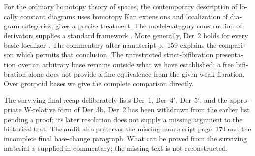 \begin{otherlanguage}{english}
For the ordinary homotopy theory of spaces, the contemporary description of locally constant diagrams uses homotopy Kan extensions and localization of diagram categories; \citet{Cisinski2009LocallyConstant} gives a precise treatment. The model-category construction of derivators supplies a standard framework \citep{Cisinski2003,Groth2013}. More generally, Der~2 holds for every basic localizer \citep[Propositions~3.1.30 and~4.2.7]{Cisinski2006}. The commentary after manuscript p.~159 explains the comparison which permits that conclusion. The unrestricted strict-bifibration presentation over an arbitrary base remains outside what we have established: a free bifibration alone does not provide a fine equivalence from the given weak fibration. Over groupoid bases we give the complete comparison directly.

The surviving final recap deliberately lists Der~1, Der~$4'$, Der~$5'$, and the appropriate W-relative form of Der~3b. Der~2 has been withdrawn from the earlier list pending a proof; its later resolution does not supply a missing argument to the historical text. The audit also preserves the missing manuscript page~170 and the incomplete final base-change paragraph. What can be proved from the surviving material is supplied in commentary; the missing text is not reconstructed.
\end{otherlanguage}
\dgrchunkend
